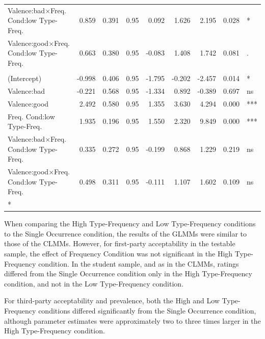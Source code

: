 \documentclass[
]{article}
\begin{document}
\begin{longtable}[t]{lrrrrrrrl}
Valence:bad$\times$Freq.
Cond:low
\hspace{1em}Type-Freq. & 0.859 & 0.391 & 0.95 & 0.092 & 1.626 & 2.195 & 0.028 & *\\
Valence:good$\times$Freq.
Cond:low
\hspace{1em}Type-Freq. & 0.663 & 0.380 & 0.95 & -0.083 & 1.408 & 1.742 & 0.081 & .\\
\addlinespace[0.3em]
\multicolumn{9}{l}{\textbf{Prevalence - Low Type-Frequency (vs. Single Occurrence) - Testable}}\\
\hspace{1em}(Intercept) & -0.998 & 0.406 & 0.95 & -1.795 & -0.202 & -2.457 & 0.014 & *\\
\hspace{1em}Valence:bad & -0.221 & 0.568 & 0.95 & -1.334 & 0.892 & -0.389 & 0.697 & ns\\
\hspace{1em}Valence:good & 2.492 & 0.580 & 0.95 & 1.355 & 3.630 & 4.294 & 0.000 & ***\\
Freq.
Cond:low
\hspace{1em}Type-Freq. & 1.935 & 0.196 & 0.95 & 1.550 & 2.320 & 9.849 & 0.000 & ***\\
Valence:bad$\times$Freq.
Cond:low
\hspace{1em}Type-Freq. & 0.335 & 0.272 & 0.95 & -0.199 & 0.868 & 1.229 & 0.219 & ns\\
Valence:good$\times$Freq.
Cond:low
\hspace{1em}Type-Freq. & 0.498 & 0.311 & 0.95 & -0.111 & 1.107 & 1.602 & 0.109 & ns\\*
\end{longtable}

When comparing the High Type-Frequency and Low Type-Frequency conditions to the Single Occurrence condition, the results of the GLMMs were similar to those of the CLMMs. However, for first-party acceptability in the testable sample, the effect of Frequency Condition was not significant in the High Type-Frequency condition. In the student sample, and as in the CLMMs, ratings differed from the Single Occurrence condition only in the High Type-Frequency condition, and not in the Low Type-Frequency condition.

For third-party acceptability and prevalence, both the High and Low Type-Frequency conditions differed significantly from the Single Occurrence condition, although parameter estimates were approximately two to three times larger in the High Type-Frequency condition.
\end{document}
